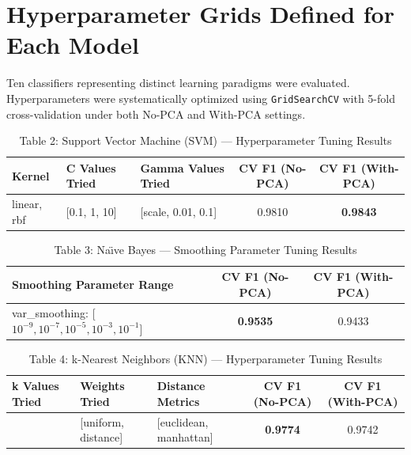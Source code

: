 \documentclass[12pt,a4paper]{article}
\begin{document}
\section{Hyperparameter Grids Defined for Each Model}
Ten classifiers representing distinct learning paradigms were evaluated. Hyperparameters were systematically optimized using \texttt{GridSearchCV} with 5-fold cross-validation under both No-PCA and With-PCA settings.

\begin{table}[H]
\centering
\caption{Table 2: Support Vector Machine (SVM) --- Hyperparameter Tuning Results}
\label{tab:table2}
\begin{tabular}{|p{3.2cm}|p{3.2cm}|p{3.5cm}|c|c|}
\hline
\textbf{Kernel} & \textbf{C Values Tried} & \textbf{Gamma Values Tried} & \textbf{CV F1 (No-PCA)} & \textbf{CV F1 (With-PCA)} \\ \hline
linear, rbf & [0.1, 1, 10] & [scale, 0.01, 0.1] & 0.9810 & \textbf{0.9843} \\ \hline
\end{tabular}
\end{table}

\begin{table}[H]
\centering
\caption{Table 3: Na\"\i ve Bayes --- Smoothing Parameter Tuning Results}
\label{tab:table3}
\begin{tabular}{|p{7.5cm}|c|c|}
\hline
\textbf{Smoothing Parameter Range} & \textbf{CV F1 (No-PCA)} & \textbf{CV F1 (With-PCA)} \\ \hline
var\_smoothing: [$10^{-9}, 10^{-7}, 10^{-5}, 10^{-3}, 10^{-1}$] & \textbf{0.9535} & 0.9433 \\ \hline
\end{tabular}
\end{table}

\begin{table}[H]
\centering
\caption{Table 4: k-Nearest Neighbors (KNN) --- Hyperparameter Tuning Results}
\label{tab:table4}
\begin{tabular}{|p{3cm}|p{3.2cm}|p{3.5cm}|c|c|}
\hline
\textbf{k Values Tried} & \textbf{Weights Tried} & \textbf{Distance Metrics} & \textbf{CV F1 (No-PCA)} & \textbf{CV F1 (With-PCA)} \\ \hline
[3, 5, 7, 9, 11] & [uniform, distance] & [euclidean, manhattan] & \textbf{0.9774} & 0.9742 \\ \hline
\end{tabular}
\end{table}
\end{document}
